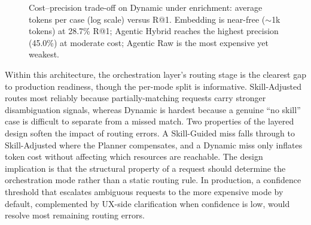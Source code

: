 \documentclass[10pt,twocolumn]{article}
\begin{document}
\begin{figure}[t]
  \centering
  \caption{Cost--precision trade-off on Dynamic under enrichment: average tokens per case (log scale) versus R@1. Embedding is near-free ($\sim$1k tokens) at 28.7\% R@1; Agentic Hybrid reaches the highest precision (45.0\%) at moderate cost; Agentic Raw is the most expensive yet weakest.}
  \label{fig:pareto}
\end{figure}

Within this architecture, the orchestration layer's routing stage is the clearest gap to production readiness, though the per-mode split is informative. Skill-Adjusted routes most reliably because partially-matching requests carry stronger disambiguation signals, whereas Dynamic is hardest because a genuine ``no skill'' case is difficult to separate from a missed match. Two properties of the layered design soften the impact of routing errors. A Skill-Guided miss falls through to Skill-Adjusted where the Planner compensates, and a Dynamic miss only inflates token cost without affecting which resources are reachable. The design implication is that the structural property of a request should determine the orchestration mode rather than a static routing rule. In production, a confidence threshold that escalates ambiguous requests to the more expensive mode by default, complemented by UX-side clarification when confidence is low, would resolve most remaining routing errors.
\end{document}

